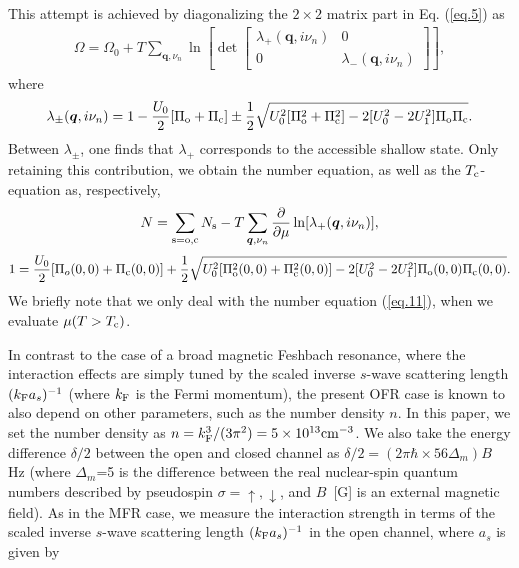 \documentclass[a4paper]{jpconf}
\begin{document}
\par
This attempt is achieved by diagonalizing the $2\times 2$ matrix part in Eq. (\ref{eq.5}) as 
\begin{eqnarray}
\Omega = \Omega_0+ T
\sum_{{\bm q},\nu_n} \ln 
\left[
\det
\left[
\begin{array}{cc}
\lambda_+({\bm q},i\nu_n) &0 \\
0& \lambda_-({\bm q},i\nu_n)
\end{array}
\right]
\right],
\label{eq.9}
\end{eqnarray}
where
\begin{equation}
\lambda_\pm({\bm q},i\nu_n) =
1-{U_0 \over 2}[\Pi_{\rm o}+\Pi_{\rm c}]
\pm
{1 \over 2}
\sqrt{U_0^2[\Pi_{\rm o}^2+\Pi_{\rm c}^2]-2[U_0^2-2U_1^2]\Pi_{\rm o}\Pi_{\rm c}}.
\label{eq.10}
\end{equation}
Between $\lambda_\pm$, one finds that $\lambda_+$ corresponds to the accessible shallow state. Only retaining this contribution, we obtain the number equation, as well as the $T_{\rm c}$-equation as, respectively,
\begin{equation}
N=\sum_{{\rm s}={\rm o,c}}N_{\rm s}
-T\sum_{{\bm q},\nu_n}
{\partial \over \partial\mu}\ln[\lambda_+({\bm q},i\nu_n)],
\label{eq.11}
\end{equation}
\begin{equation}
1={U_0 \over 2}[\Pi_o(0,0)+\Pi_{\rm c}(0,0)]
+{1 \over 2}
\sqrt{U_0^2[\Pi_{\rm o}^2(0,0)+\Pi_{\rm c}^2(0,0)]-2[U_0^2-2U_1^2]\Pi_{\rm o}(0,0)\Pi_{\rm c}(0,0)}.
\label{eq.12}
\end{equation}
We briefly note that we only deal with the number equation (\ref{eq.11}), when we evaluate $\mu(T>T_{\rm c})$.
\par
In contrast to the case of a broad magnetic Feshbach resonance, where the interaction effects are simply tuned by the scaled inverse $s$-wave scattering length $(k_{\rm F}a_s)^{-1}$ (where $k_{\rm F}$ is the Fermi momentum), the present OFR case is known to also depend on other parameters, such as the number density $n$\cite{Junjin}. In this paper, we set the number density as $n=k_{\rm F}^3/(3\pi^2)=5\times 10^{13} {\rm cm}^{-3}$\cite{Zhang,Junjin}. We also take the energy difference $\delta/2$ between the open and closed channel as $\delta/2=(2\pi\hbar\times 56\Delta_m)B$ Hz\cite{Zhang,Junjin} (where $\Delta_m$=5 is the difference between the real nuclear-spin quantum numbers described by pseudospin $\sigma=\uparrow,\downarrow$, and $B$~[G] is an external magnetic field). As in the MFR case, we measure the interaction strength in terms of the scaled inverse $s$-wave scattering length $(k_{\rm F}a_s)^{-1}$ in the open channel, where $a_s$ is given by\cite{Zhang}
\end{document}
